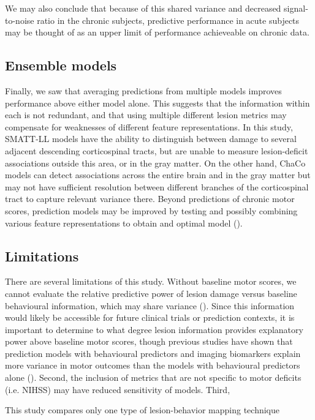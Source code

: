 \documentclass[phd,tocprelim]{cornell}
\begin{document}
We may also conclude that because of this shared variance and decreased signal-to-noise ratio in the chronic subjects, predictive performance in acute subjects may be thought of as an upper limit of performance achieveable on chronic data. 

\subsection{Ensemble models}
Finally, we saw that averaging predictions from multiple models improves performance above either model alone. This suggests that the information within each is not redundant, and that using multiple different lesion metrics may compensate for weaknesses of different feature representations. In this study, SMATT-LL models have the ability to distinguish between damage to several adjacent descending corticospinal tracts, but are unable to measure lesion-deficit associations outside this area, or in the gray matter. On the other hand, ChaCo models can detect associations across the entire brain and in the gray matter but may not have sufficient resolution between different branches of the corticospinal tract to capture relevant variance there. Beyond predictions of chronic motor scores, prediction models may be improved by testing and possibly combining various feature representations to obtain and optimal model (\cite{Kasties2021-rm}).

\subsection{Limitations}
There are several limitations of this study. Without baseline motor scores, we cannot evaluate the relative predictive power of lesion damage versus baseline behavioural information, which may share variance (\cite{Feng2015-du, Bowren2022-rs}). Since this information would likely be accessible for future clinical trials or prediction contexts, it is important to determine to what degree lesion information provides explanatory power above baseline motor scores, though previous studies have shown that prediction models with behavioural predictors and imaging biomarkers explain more variance in motor outcomes than the models with behavioural predictors alone (\cite{Kim2017-xe, Feng2015-du}). Second, the inclusion of metrics that are not specific to motor deficits (i.e. NIHSS) may have reduced sensitivity of models. Third,

This study compares only one type of lesion-behavior mapping technique 
\end{document}
